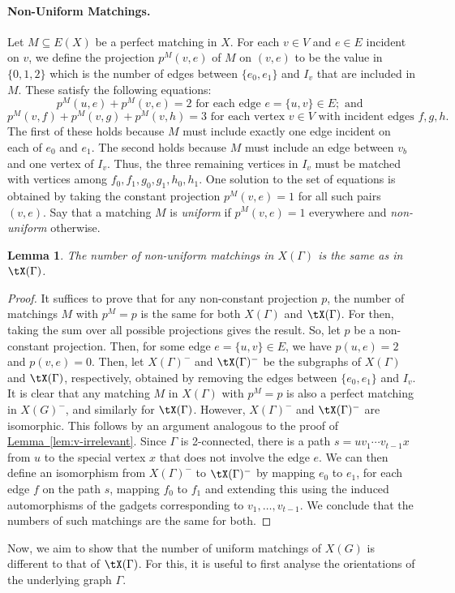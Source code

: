 \documentclass[11pt]{article}
\newcommand{\expref}[2]{\texorpdfstring{\hyperref[#2]{#1~\ref{#2}}}{#1~\ref{#2}}}
\newtheorem{lemma}[theorem]{Lemma}
\begin{document}
\paragraph{Non-Uniform Matchings.}
Let $M \subseteq E(X)$ be a perfect matching in $X$. For each $v \in V$ and $e
\in E$ incident on $v$, we define the projection $p^M(v,e)$ of $M$ on $(v,e)$ to
be the value in $\{0,1,2\}$ which is the number of edges between $\{e_0,e_1\}$
and $I_v$ that are included in $M$. These satisfy the following equations:
$$p^M(u,e) + p^M(v,e) = 2 \text{ for each edge } e = \{u,v\} \in E; \text{ and }$$
$$p^M(v,f) + p^M(v,g) + p^M(v,h) = 3 \text{ for each vertex } v \in V \text{ with incident edges } f,g,h.$$
The first of these holds because $M$ must include exactly one edge incident on
each of $e_0$ and $e_1$. The second holds because $M$ must include an edge
between $v_b$ and one vertex of $I_v$. Thus, the three remaining vertices in
$I_v$ must be matched with vertices among $f_0,f_1,g_0,g_1,h_0,h_1$.
One solution to the set of equations is obtained by taking the constant
projection $p^M(v,e) = 1$ for all such pairs $(v,e)$. Say that a matching $M$ is
\emph{uniform} if $p^M(v,e) = 1$ everywhere and \emph{non-uniform} otherwise.
\begin{lemma}\label{lem:non-uniform}
  The number of non-uniform matchings in $X(\Gamma)$ is the same as in $\tX(\Gamma)$.
\end{lemma}
\begin{proof}
  It suffices to prove that for any non-constant projection $p$, the number of
  matchings $M$ with $p^{M} = p$ is the same for both $X(\Gamma)$ and $\tX(\Gamma)$. For
  then, taking the sum over all possible projections gives the result. So, let
  $p$ be a non-constant projection. Then, for some edge $e = \{u,v\} \in E$, we
  have $p(u,e) = 2$ and $p(v,e) = 0$. Then, let $X(\Gamma)^-$ and $\tX(\Gamma)^-$ be the
  subgraphs of $X(\Gamma)$ and $\tX(\Gamma)$, 
  respectively, %
  obtained by removing the edges
  between $\{e_0,e_1\}$ and $I_v$. It is clear that any matching $M$ in $X(\Gamma)$
  with $p^{M} = p$ is also a perfect matching in $X(G)^-$, and similarly for
  $\tX(\Gamma)$. However, $X(\Gamma)^-$ and $\tX(\Gamma)^-$ are isomorphic. This follows by an
  argument analogous to the proof of \expref{Lemma}{lem:v-irrelevant}. Since $\Gamma$ is
  2-connected, there is a path $s = uv_1\cdots v_{t-1}x$ from $u$ to the special vertex $x$ that does
  not involve the edge $e$. We can then define an isomorphism from $X(\Gamma)^-$ to
  $\tX(\Gamma)^-$ by mapping $e_0$ to $e_1$, for each edge $f$ on the path $s$, mapping
  $f_0$ to $f_1$ and extending this using the induced automorphisms of the
  gadgets corresponding to $v_1,\ldots,v_{t-1}$. We conclude that the numbers of
  such matchings are the same for both.
\end{proof}
Now, we aim to show that the number of uniform matchings of $X(G)$ is different
to that of $\tX(\Gamma)$. For this, it is useful to first analyse the orientations of
the underlying graph $\Gamma$.
\end{document}
